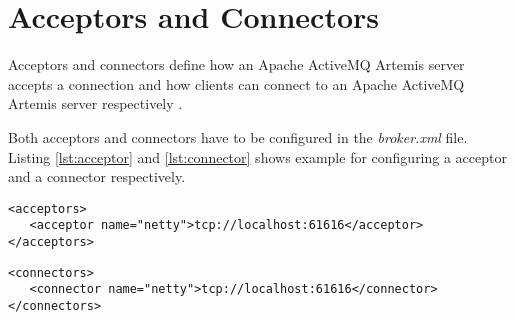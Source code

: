 \section{Acceptors and Connectors}

Acceptors and connectors define how an Apache ActiveMQ Artemis server accepts a connection and how clients can connect to an Apache ActiveMQ Artemis server respectively \parencite{artemis_transports}.

Both acceptors and connectors have to be configured in the \textit{broker.xml} file. Listing \ref{lst:acceptor} and \ref{lst:connector} shows example for configuring a acceptor and a connector respectively.

\bigskip
\begin{lstlisting}[style=XmlInputStyle,caption=Configuring acceptor example, label={lst:acceptor}]
<acceptors>
   <acceptor name="netty">tcp://localhost:61616</acceptor>
</acceptors>
\end{lstlisting}

\bigskip
\begin{lstlisting}[style=XmlInputStyle,caption=Configuring connector example, label={lst:connector}]
<connectors>
   <connector name="netty">tcp://localhost:61616</connector>
</connectors>
\end{lstlisting}
